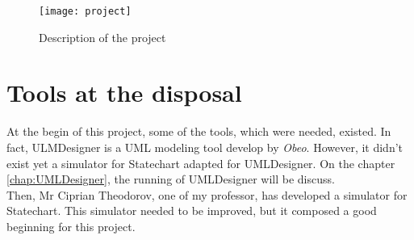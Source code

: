\begin{figure}[h]
  \centering
\texttt{[image: project]}
  \caption{Description of the project}
  \label{fig:project}
\end{figure}


\section{Tools at the disposal}

At the begin of this project, some of the tools, which were needed, existed. In fact, ULMDesigner is a UML modeling tool develop by \textit{Obeo}. However, it didn't exist yet a simulator for Statechart adapted for UMLDesigner. On the chapter \ref{chap:UMLDesigner}, the running of UMLDesigner will be discuss.~\\

Then, Mr Ciprian Theodorov, one of my professor, has developed a simulator for Statechart. This simulator needed to be improved, but it composed a good beginning for this project.



